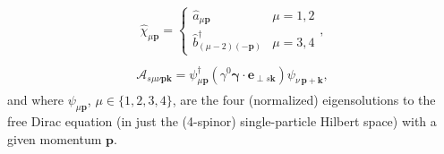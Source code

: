 \documentclass{report}
\begin{document}
\begin{align}
\begin{aligned}
	\hat \chi_{\mu \boldsymbol{p}} = 
		\begin{cases}
			\hat a_{\mu \boldsymbol{p}} & \mu=1,2\\
			\hat b^\dagger_{(\mu-2) (-\boldsymbol{p})} & \mu=3,4
		\end{cases},
\end{aligned}
\end{align}
%
\begin{align}
\begin{aligned}
	\mathcal{A}_{s \mu \nu \boldsymbol{p} \boldsymbol{k}} = 
		\psi_{\mu \boldsymbol{p}}^\dagger
		(\gamma^0 \boldsymbol\gamma \cdot \boldsymbol{e}_{\perp s \boldsymbol{k}})
		\psi_{\nu\, \boldsymbol{p} + \boldsymbol{k}},
	\label{mathcal_A_01}
\end{aligned}
\end{align}
and where $\psi_{\mu \boldsymbol{p}}$, $\mu \in \{1, 2, 3, 4\}$, are the four (normalized) eigensolutions to the free Dirac equation (in just the (4-spinor) single-particle Hilbert space) with a given momentum $\boldsymbol{p}$.
\end{document}

